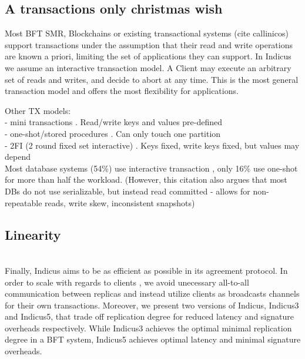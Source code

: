 \subsection{A transactions only christmas wish}
Most BFT SMR, Blockchains or existing transactional systems (cite callinicos) support transactions under the assumption that their read and write operations are known a priori, limiting the set of applications they can support. In Indicus we assume an interactive transaction model. A Client may execute an arbitrary set of reads and writes, and decide to abort at any time. This is the most general transaction model and offers the most flexibility for applications.


Other TX models:\\
- mini transactions \cite{aguilera2007sinfonia}. Read/write keys and values pre-defined\\
- one-shot/stored procedures \cite{mu2016consolidating, mu2014extracting}. Can only touch one partition\\
- 2FI (2 round fixed set interactive) \cite{yan2018carousel}. Keys fixed, write keys fixed, but values may depend\\
Most database systems (54\%) use interactive transaction \cite{pavlo2017we}, only 16\% use one-shot for more than half the workload. (However, this citation also argues that most DBs do not use serializable, but instead read committed - allows for non-repeatable reads, write skew, inconsistent snapshots)

\subsection{Linearity}
\\
Finally, Indicus aims to be as efficient as possible in its agreement protocol. In order to scale with regards to clients , we avoid unecessary all-to-all communication between replicas and instead utilize clients as broadcasts channels for their own transactions. Moreover, we present two versions of Indicus, Indicus3 and Indicus5, that trade off replication degree for reduced latency and signature overheads respectively. While Indicus3 achieves the optimal minimal replication degree in a BFT system, Indicus5 achieves optimal latency and minimal signature overheads.


